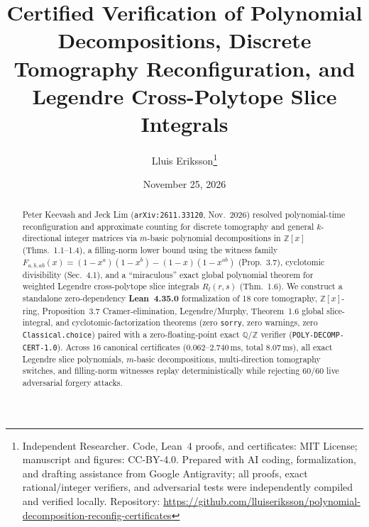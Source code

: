 \documentclass[10pt,twocolumn]{article}
\title{\vspace{-1.1em}\textbf{Certified Verification of Polynomial Decompositions, Discrete Tomography Reconfiguration, and Legendre Cross-Polytope Slice Integrals}}
\author{Lluis Eriksson\thanks{Independent Researcher. Code, Lean~4 proofs, and certificates: MIT License; manuscript and figures: CC-BY-4.0. Prepared with AI coding, formalization, and drafting assistance from Google Antigravity; all proofs, exact rational/integer verifiers, and adversarial tests were independently compiled and verified locally. Repository: \url{https://github.com/lluiseriksson/polynomial-decomposition-reconfig-certificates}}}
\date{November 25, 2026}
\begin{document}
\maketitle
\vspace{-1.4em}

\begin{abstract}
Peter Keevash and Jeck Lim (\texttt{arXiv:2611.33120}, Nov.\ 2026) resolved polynomial-time reconfiguration and approximate counting for discrete tomography and general $k$-directional integer matrices via $m$-basic polynomial decompositions in $\mathbb{Z}[x]$ (Thms.~1.1--1.4), a filling-norm lower bound using the witness family $F_{a,b,ab}(x) = (1-x^a)(1-x^b)-(1-x)(1-x^{ab})$ (Prop.~3.7), cyclotomic divisibility (Sec.~4.1), and a ``miraculous'' exact global polynomial theorem for weighted Legendre cross-polytope slice integrals $R_l(r,s)$ (Thm.~1.6). We construct a standalone zero-dependency \textbf{Lean~4.35.0} formalization of 18 core tomography, $\mathbb{Z}[x]$-ring, Proposition~3.7 Cramer-elimination, Legendre/Murphy, Theorem~1.6 global slice-integral, and cyclotomic-factorization theorems (zero \texttt{sorry}, zero warnings, zero \texttt{Classical.choice}) paired with a zero-floating-point exact $\mathbb{Q}/\mathbb{Z}$ verifier (\texttt{POLY-DECOMP-CERT-1.0}). Across 16 canonical certificates ($0.062$--$2.740\,\mathrm{ms}$, total $8.07\,\mathrm{ms}$), all exact Legendre slice polynomials, $m$-basic decompositions, multi-direction tomography switches, and filling-norm witnesses replay deterministically while rejecting 60/60 live adversarial forgery attacks.
\end{abstract}
\end{document}
